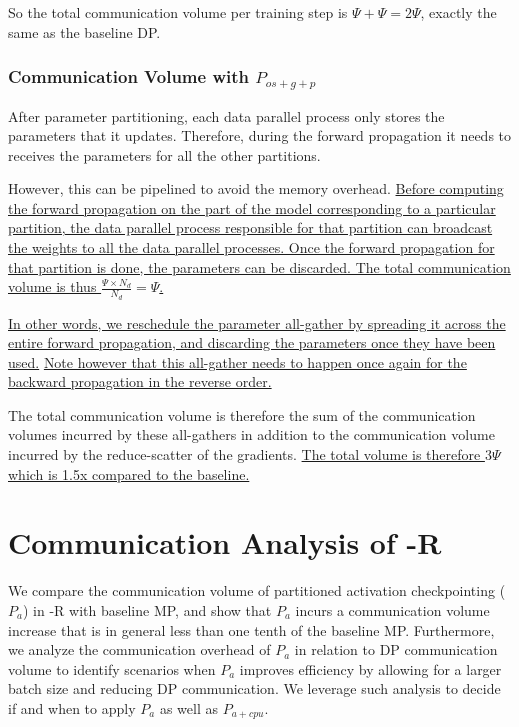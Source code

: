 So the total communication volume per training step is $\Psi+\Psi= 2\Psi$, exactly the same as the baseline DP.

\subsubsection{Communication Volume with $P_{os+g+p}$ }

After parameter partitioning, each data parallel process only stores the parameters that it updates. Therefore, during the forward propagation it needs to receives the parameters for all the other partitions.

However, this can be pipelined to avoid the memory overhead. \uline{Before computing the forward propagation on the part of the model corresponding to a particular partition, the data parallel process responsible for that partition can broadcast the weights to all the data parallel processes. Once the forward propagation for that partition is done, the parameters can be discarded. The total communication volume is thus $\frac{\Psi \times N_d}{N_d} = \Psi$.}

\uline{In other words, we reschedule the parameter all-gather by spreading it across the entire forward propagation, and discarding the parameters once they have been used.} \uline{Note however that this all-gather needs to happen once again for the backward propagation in the reverse order.}

The total communication volume is therefore the sum of the communication volumes incurred by these all-gathers in addition to the communication volume incurred by the reduce-scatter of the gradients. \uline{The total volume is therefore $3\Psi$ which is 1.5x compared to the baseline.}

\section{Communication Analysis of \name-R}
We compare the communication volume of partitioned activation checkpointing ($P_a$) in \name-R with baseline MP, and show that $P_a$ incurs a communication volume increase that is in general less than one tenth of the baseline MP. Furthermore, we analyze the communication overhead of $P_a$ in relation to DP communication volume to identify scenarios when $P_a$ improves efficiency by allowing for a larger batch size and reducing DP communication.  We leverage such analysis to decide if and when to apply  $P_a$ as well as $P_{a+cpu}$.  

